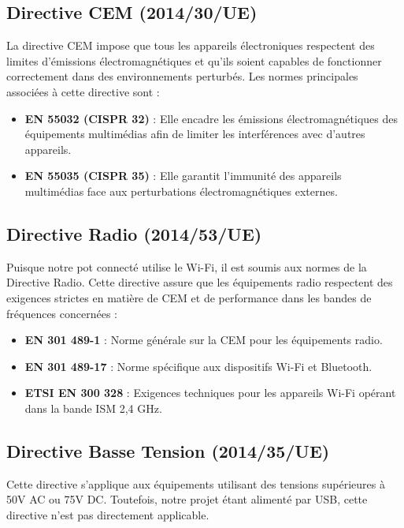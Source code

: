 \documentclass[a4paper,12pt]{article}
\begin{document}
\subsection{Directive CEM (2014/30/UE)}
La directive CEM impose que tous les appareils électroniques respectent des limites d'émissions électromagnétiques et qu'ils soient capables de fonctionner correctement dans des environnements perturbés. Les normes principales associées à cette directive sont :
\begin{itemize}
    \item \textbf{EN 55032 (CISPR 32)} : Elle encadre les émissions électromagnétiques des équipements multimédias afin de limiter les interférences avec d'autres appareils.
    \item \textbf{EN 55035 (CISPR 35)} : Elle garantit l'immunité des appareils multimédias face aux perturbations électromagnétiques externes.
\end{itemize}

\subsection{Directive Radio (2014/53/UE)}
Puisque notre pot connecté utilise le Wi-Fi, il est soumis aux normes de la Directive Radio. Cette directive assure que les équipements radio respectent des exigences strictes en matière de CEM et de performance dans les bandes de fréquences concernées :
\begin{itemize}
    \item \textbf{EN 301 489-1} : Norme générale sur la CEM pour les équipements radio.
    \item \textbf{EN 301 489-17} : Norme spécifique aux dispositifs Wi-Fi et Bluetooth.
    \item \textbf{ETSI EN 300 328} : Exigences techniques pour les appareils Wi-Fi opérant dans la bande ISM 2,4 GHz.
\end{itemize}

\subsection{Directive Basse Tension (2014/35/UE)}
Cette directive s'applique aux équipements utilisant des tensions supérieures à 50V AC ou 75V DC. Toutefois, notre projet étant alimenté par USB, cette directive n'est pas directement applicable.
\end{document}
